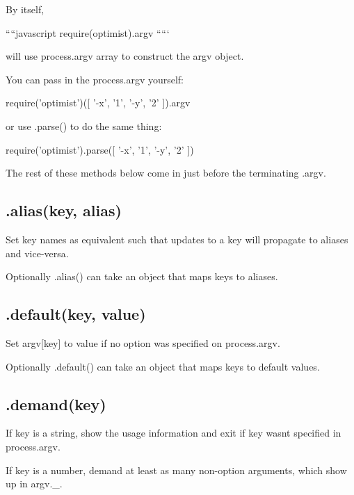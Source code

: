 By itself,

````javascript require(\textquotesingle{}optimist\textquotesingle{}).argv `````

will use {\ttfamily process.\+argv} array to construct the {\ttfamily argv} object.

You can pass in the {\ttfamily process.\+argv} yourself\+:


\begin{DoxyCode}
require('optimist')([ '-x', '1', '-y', '2' ]).argv
\end{DoxyCode}


or use .parse() to do the same thing\+:


\begin{DoxyCode}
require('optimist').parse([ '-x', '1', '-y', '2' ])
\end{DoxyCode}


The rest of these methods below come in just before the terminating {\ttfamily .argv}.

\subsection*{.alias(key, alias) }

Set key names as equivalent such that updates to a key will propagate to aliases and vice-\/versa.

Optionally {\ttfamily .alias()} can take an object that maps keys to aliases.

\subsection*{.default(key, value) }

Set {\ttfamily argv\mbox{[}key\mbox{]}} to {\ttfamily value} if no option was specified on {\ttfamily process.\+argv}.

Optionally {\ttfamily .default()} can take an object that maps keys to default values.

\subsection*{.demand(key) }

If {\ttfamily key} is a string, show the usage information and exit if {\ttfamily key} wasn\textquotesingle{}t specified in {\ttfamily process.\+argv}.

If {\ttfamily key} is a number, demand at least as many non-\/option arguments, which show up in {\ttfamily argv.\+\_\+}.

